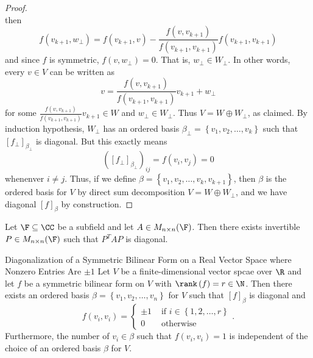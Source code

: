 \documentclass[linearalgebra]{subfiles}
\begin{document}
\begin{proof}
\begin{equation*}
        \end{equation*}
        then
        \begin{equation*}
            f\left( v_{k+1}, w_\perp \right) = f\left( v_{k+1}, v \right) - \frac{f\left( v, v_{k+1} \right) }{f\left( v_{k+1},v_{k+1} \right) }f\left( v_{k+1},v_{k+1} \right) 
        \end{equation*}
        and since $f$ is symmetric, $f\left( v, w_\perp \right) = 0$. That is, $w_\perp\in W_\perp$. In other words, every $v\in V$ can be written as
        \begin{equation*}
            v = \frac{f\left( v, v_{k+1} \right) }{f\left( v_{k+1},v_{k+1} \right) }v_{k+1} + w_\perp
        \end{equation*}
        for some $\frac{f\left( v, v_{k+1} \right) }{f\left( v_{k+1},v_{k+1} \right) }v_{k+1}\in W$ and $w_\perp\in W_\perp$. Thus $V=W\oplus W_\perp$, as claimed. By induction hypothesis, $W_\perp$ has an ordered basis $\beta_\perp = \left\lbrace v_1,v_2,\ldots,v_k \right\rbrace $ such that $\left[ f_\perp \right] _{\beta_\perp}$ is diagonal. But this exactly means
        \begin{equation*}
            \left( \left[ f_\perp \right] _{\beta_\perp} \right) _{ij} = f\left( v_i,v_j \right) = 0
        \end{equation*}
        whenenver $i\neq j$. Thus, if we define $\beta = \left\lbrace v_1,v_2,\ldots,v_k,v_{k+1} \right\rbrace$, then $\beta$ is the ordered basis for $V$ by direct sum decomposition $V = W\oplus W_\perp$, and we have diagonal $\left[ f \right] _\beta$ by construction.
    \end{proof}

    \begin{cor}{}
        Let $\F\subseteq\CC$ be a subfield and let $A\in M_{n\times n}(\F)$. Then there exists invertible $P\in M_{n\times n}(\F)$ such that $P^TAP$ is diagonal.
    \end{cor}	

    \begin{theorem}{Diagonalization of a Symmetric Bilinear Form on a Real Vector Space where Nonzero Entries Are $\pm 1$}
        Let $V$ be a finite-dimensional vector spcae over $\R$ and let $f$ be a symmetric bilinear form on $V$ with $\rank\left( f \right) = r\in\N$. Then there exists an ordered basis $\beta=\left\lbrace v_1,v_2,\ldots,v_n \right\rbrace $ for $V$ such that $\left[ f \right] _\beta$ is diagonal and
        \begin{equation*}
            f\left( v_i,v_i \right) =
            \begin{cases} 
                \pm 1 & \text{ if } i\in\left\lbrace 1,2,\ldots,r \right\rbrace \\ 
                0 & \text{ otherwise }
            \end{cases}.
        \end{equation*}
        Furthermore, the number of $v_i\in\beta$ such that $f\left( v_i,v_i \right) = 1$ is independent of the choice of an ordered basis $\beta$ for $V$. 
    \end{theorem}
\end{document}
